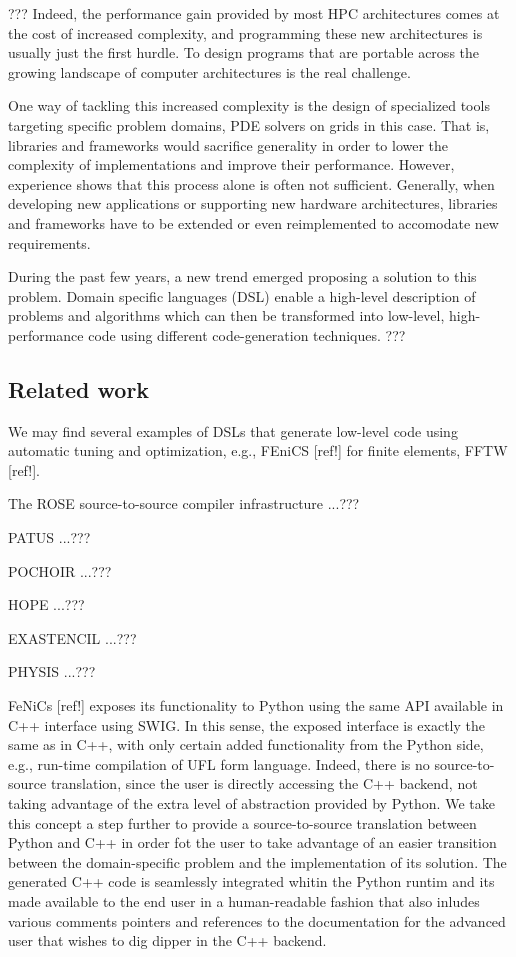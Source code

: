 \documentclass[english]{article}
\begin{document}
???
Indeed, the performance gain provided by most HPC architectures comes at the cost of increased complexity, and programming these new architectures is usually just the first hurdle.
To design programs that are portable across the growing landscape of computer architectures is the real challenge.

One way of tackling this increased complexity is the design of specialized tools targeting specific problem domains, PDE solvers on grids in this case.
That is, libraries and frameworks would sacrifice generality in order to lower the complexity of implementations and improve their performance.
However, experience shows that this process alone is often not sufficient. 
Generally, when developing new applications or supporting new hardware architectures, libraries and frameworks have to be extended or even reimplemented to accomodate new requirements.

During the past few years, a new trend emerged proposing a solution to this problem. Domain specific languages (DSL) enable a high-level description of problems and algorithms which can then be transformed into low-level, high-performance code using different code-generation techniques.
???


\subsection{Related work}
We may find several examples of DSLs that generate low-level code using automatic tuning and optimization, e.g., FEniCS [ref!] for finite elements, FFTW [ref!].

The ROSE source-to-source compiler infrastructure ...???

PATUS ...???

POCHOIR ...???

HOPE ...???

EXASTENCIL ...???

PHYSIS ...???

FeNiCs [ref!] exposes its functionality to Python using the same API available in C++ interface using SWIG.
In this sense, the exposed interface is exactly the same as in C++, with only certain added functionality from the Python side, e.g., run-time compilation of UFL form language.
Indeed, there is no source-to-source translation, since the user is directly accessing the C++ backend, not taking advantage of the extra level of abstraction provided by Python.
We take this concept a step further to provide a source-to-source translation between Python and C++ in order fot the user to take advantage of an easier transition between the domain-specific problem and the implementation of its solution.
The generated C++ code is seamlessly integrated whitin the Python runtim and its made available to the end user in a human-readable fashion that also inludes various comments pointers and references to the documentation for the advanced user that wishes to dig dipper in the C++ backend.
\end{document}
